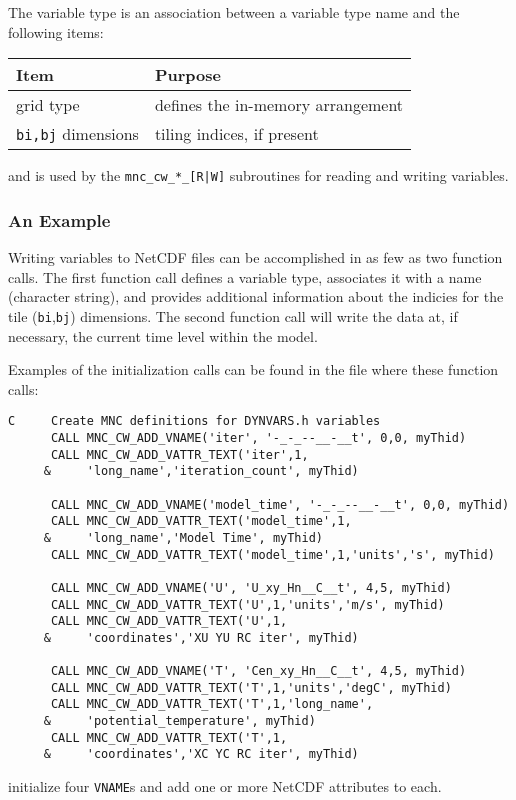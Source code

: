 The variable type is an association between a variable type name and the
following items:
\begin{center}
  \begin{tabular}[h]{|l|l|}\hline
    \textbf{Item}  & \textbf{Purpose}  \\\hline
    grid type  &  defines the in-memory arrangement  \\
    \texttt{bi,bj} dimensions  &  tiling indices, if present  \\\hline
  \end{tabular}
\end{center}
and is used by the \texttt{mnc\_cw\_*\_[R|W]} subroutines for reading
and writing variables.


\subsubsection{An Example}

Writing variables to NetCDF files can be accomplished in as few as two
function calls.  The first function call defines a variable type,
associates it with a name (character string), and provides additional
information about the indicies for the tile (\texttt{bi},\texttt{bj})
dimensions.  The second function call will write the data at, if
necessary, the current time level within the model.

Examples of the initialization calls can be found in the file 
where these function calls:
{\footnotesize
\begin{verbatim}
C     Create MNC definitions for DYNVARS.h variables
      CALL MNC_CW_ADD_VNAME('iter', '-_-_--__-__t', 0,0, myThid)
      CALL MNC_CW_ADD_VATTR_TEXT('iter',1,
     &     'long_name','iteration_count', myThid)

      CALL MNC_CW_ADD_VNAME('model_time', '-_-_--__-__t', 0,0, myThid)
      CALL MNC_CW_ADD_VATTR_TEXT('model_time',1,
     &     'long_name','Model Time', myThid)
      CALL MNC_CW_ADD_VATTR_TEXT('model_time',1,'units','s', myThid)

      CALL MNC_CW_ADD_VNAME('U', 'U_xy_Hn__C__t', 4,5, myThid)
      CALL MNC_CW_ADD_VATTR_TEXT('U',1,'units','m/s', myThid)
      CALL MNC_CW_ADD_VATTR_TEXT('U',1,
     &     'coordinates','XU YU RC iter', myThid)

      CALL MNC_CW_ADD_VNAME('T', 'Cen_xy_Hn__C__t', 4,5, myThid)
      CALL MNC_CW_ADD_VATTR_TEXT('T',1,'units','degC', myThid)
      CALL MNC_CW_ADD_VATTR_TEXT('T',1,'long_name',
     &     'potential_temperature', myThid)
      CALL MNC_CW_ADD_VATTR_TEXT('T',1,
     &     'coordinates','XC YC RC iter', myThid)
\end{verbatim}
}
{\noindent initialize four \texttt{VNAME}s and add one or more NetCDF
  attributes to each.}
    
